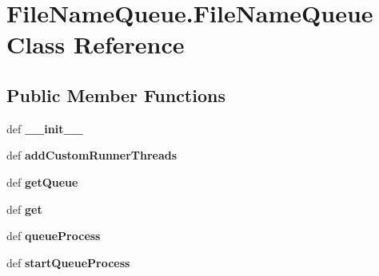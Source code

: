 \hypertarget{classFileNameQueue_1_1FileNameQueue}{\section{File\-Name\-Queue.\-File\-Name\-Queue Class Reference}
\label{classFileNameQueue_1_1FileNameQueue}
}
\subsection*{Public Member Functions}
\begin{DoxyCompactItemize}
\item 
\hypertarget{classFileNameQueue_1_1FileNameQueue_aea39c38145599ec2d9bec31ac8cef68a}{def {\bfseries \-\_\-\-\_\-init\-\_\-\-\_\-}}\label{classFileNameQueue_1_1FileNameQueue_aea39c38145599ec2d9bec31ac8cef68a}

\item 
\hypertarget{classFileNameQueue_1_1FileNameQueue_abaed28219f3e10239097d7874472678d}{def {\bfseries add\-Custom\-Runner\-Threads}}\label{classFileNameQueue_1_1FileNameQueue_abaed28219f3e10239097d7874472678d}

\item 
\hypertarget{classFileNameQueue_1_1FileNameQueue_a91c5b679677cc9664dd2c16822d042e1}{def {\bfseries get\-Queue}}\label{classFileNameQueue_1_1FileNameQueue_a91c5b679677cc9664dd2c16822d042e1}

\item 
\hypertarget{classFileNameQueue_1_1FileNameQueue_aa0fad18a33d8a60e45fb56b808011667}{def {\bfseries get}}\label{classFileNameQueue_1_1FileNameQueue_aa0fad18a33d8a60e45fb56b808011667}

\item 
\hypertarget{classFileNameQueue_1_1FileNameQueue_af9c7379a4367c2ca928c7a63266e5ff5}{def {\bfseries queue\-Process}}\label{classFileNameQueue_1_1FileNameQueue_af9c7379a4367c2ca928c7a63266e5ff5}

\item 
\hypertarget{classFileNameQueue_1_1FileNameQueue_a3655c497dd707c8681369cd70b4272c3}{def {\bfseries start\-Queue\-Process}}\label{classFileNameQueue_1_1FileNameQueue_a3655c497dd707c8681369cd70b4272c3}

\end{DoxyCompactItemize}
